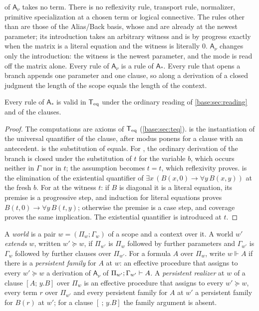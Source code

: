  of $\mathsf{A}_{\nu}$ takes no term.  There is no
reflexivity rule, transport rule, normalizer, primitive specialization at
a chosen term or logical connective.  The rules other than 
are those of the Alias/Back basis, whose  and 
are already at the newest parameter; its introduction takes an arbitrary
witness and is by progress exactly when the matrix is a literal equation
and the witness is literally $0$.  $\mathsf{A}_{\nu}$ changes only the
introduction: the witness is the newest parameter, and the mode is read off
the matrix alone.  Every rule of $\mathsf{A}_{\nu}$ is a rule of
$\mathsf{A}_{\ast}$.  Every rule that opens a branch appends one parameter
and one clause, so along a derivation of a closed judgment the length of
the scope equals the length of the context.

\begin{lemma}[Soundness]
\label{wit:lem:ab-sound}
Every rule of $\mathsf{A}_{\ast}$ is valid in $\mathsf{T}_{\mathrm{eq}}$ under the ordinary
reading of \cref{base:sec:reading} and of the clauses.
\end{lemma}

\begin{proof}
The computations are axioms of $\mathsf{T}_{\mathrm{eq}}$ (\cref{base:sec:teq}).
 is the instantiation of the universal quantifier of the
clause, after modus ponens for a clause with an antecedent.
 is the substitution of equals.  For , the
ordinary derivation of the branch is closed under the substitution of $t$
for the variable $b$, which occurs neither in $\Gamma$ nor in $t$; the
assumption becomes $t=t$, which reflexivity proves.   is the
elimination of the existential quantifier of
$\exists x\,(B(x,0)\to\forall y\,B(x,y))$ at the fresh $b$.  For
 at the witness $t$: if $B$ is diagonal it is a literal
equation, its premise is a progressive step, and induction for literal
equations proves $B(t,0)\to\forall y\,B(t,y)$; otherwise the premise is a
case step, and coverage proves the same implication.  The existential
quantifier is introduced at $t$.
\end{proof}

\begin{definition}
\label{wit:def:ab-family}
A \emph{world} is a pair $w=(\Pi_w;\Gamma_w)$ of a scope and a context over
it.  A world $w'$ \emph{extends} $w$, written $w'\succeq w$, if $\Pi_{w'}$
is $\Pi_w$ followed by further parameters and $\Gamma_{w'}$ is $\Gamma_w$
followed by further clauses over $\Pi_{w'}$.  For a formula $A$ over
$\Pi_w$, write $w\Vdash A$ if there is a \emph{persistent family} for $A$
at $w$: an effective procedure that assigns to every $w'\succeq w$ a
derivation of $\mathsf{A}_{\nu}$ of $\Pi_{w'};\Gamma_{w'}\vdash A$.  A
\emph{persistent realizer} at $w$ of a clause $[A;\,y.B]$ over $\Pi_w$ is
an effective procedure that assigns to every $w'\succeq w$, every term $r$
over $\Pi_{w'}$ and every persistent family for $A$ at $w'$ a persistent
family for $B(r)$ at $w'$; for a clause $[\ ;\,y.B]$ the family argument is
absent.
\end{definition}

